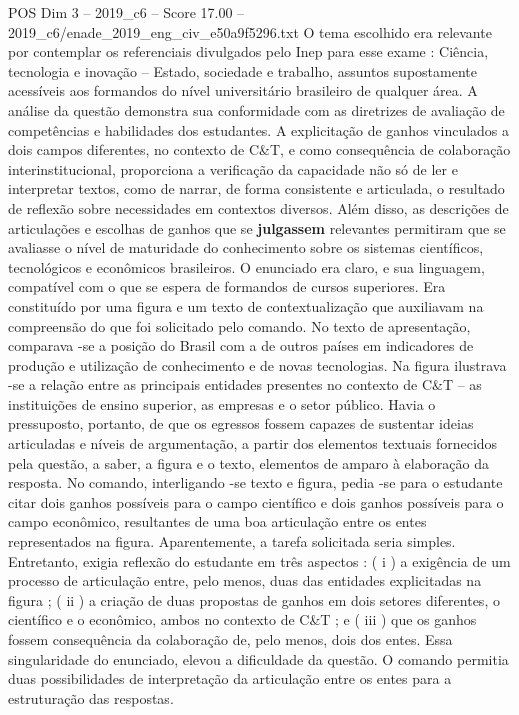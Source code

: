 \begin{textsample}{POS Dim 3 – 2019\_c6 – Score 17.00 – 2019\_c6/enade\_2019\_eng\_civ\_e50a9f5296.txt}
O tema escolhido era relevante por contemplar os referenciais divulgados pelo Inep para esse exame : Ciência, tecnologia e inovação – Estado, sociedade e trabalho, assuntos supostamente acessíveis aos formandos do nível universitário brasileiro de qualquer área.
A análise da questão demonstra sua conformidade com as diretrizes de avaliação de competências e habilidades dos estudantes.
A explicitação de ganhos vinculados a dois campos diferentes, no contexto de C\&T, e como consequência de colaboração interinstitucional, proporciona a verificação da capacidade não só de ler e interpretar textos, como de narrar, de forma consistente e articulada, o resultado de reflexão sobre necessidades em contextos diversos.
Além disso, as descrições de articulações e escolhas de ganhos que se \textbf{julgassem} relevantes permitiram que se avaliasse o nível de maturidade do conhecimento sobre os sistemas científicos, tecnológicos e econômicos brasileiros.
O enunciado era claro, e sua linguagem, compatível com o que se espera de formandos de cursos superiores.
Era constituído por uma figura e um texto de contextualização que auxiliavam na compreensão do que foi solicitado pelo comando.
No texto de apresentação, comparava -se a posição do Brasil com a de outros países em indicadores de produção e utilização de conhecimento e de novas tecnologias.
Na figura ilustrava -se a relação entre as principais entidades presentes no contexto de C\&T – as instituições de ensino superior, as empresas e o setor público.
Havia o pressuposto, portanto, de que os egressos fossem capazes de sustentar ideias articuladas e níveis de argumentação, a partir dos elementos textuais fornecidos pela questão, a saber, a figura e o texto, elementos de amparo à elaboração da resposta.
No comando, interligando -se texto e figura, pedia -se para o estudante citar dois ganhos possíveis para o campo científico e dois ganhos possíveis para o campo econômico, resultantes de uma boa articulação entre os entes representados na figura.
Aparentemente, a tarefa solicitada seria simples.
Entretanto, exigia reflexão do estudante em três aspectos : ( i ) a exigência de um processo de articulação entre, pelo menos, duas das entidades explicitadas na figura ; ( ii ) a criação de duas propostas de ganhos em dois setores diferentes, o científico e o econômico, ambos no contexto de C\&T ; e ( iii ) que os ganhos fossem consequência da colaboração de, pelo menos, dois dos entes.
Essa singularidade do enunciado, elevou a dificuldade da questão.
O comando permitia duas possibilidades de interpretação da articulação entre os entes para a estruturação das respostas.

\end{textsample}
